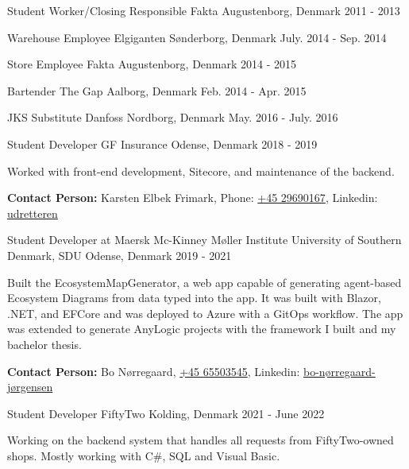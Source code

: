 \begin{cventries}
\cventry
{Student Worker/Closing Responsible} %
{Fakta} %
{Augustenborg, Denmark} %
{2011 - 2013} %
{}

\cventry
{Warehouse Employee} %
{Elgiganten} %
{Sønderborg, Denmark} %
{July. 2014 - Sep. 2014} %
{}

\cventry
{Store Employee} %
{Fakta} %
{Augustenborg, Denmark} %
{2014 - 2015} %
{}

\cventry
{Bartender} %
{The Gap} %
{Aalborg, Denmark} %
{Feb. 2014 -  Apr. 2015} %
{}

\cventry
{JKS Substitute} %
{Danfoss} %
{Nordborg, Denmark} %
{May. 2016 -  July. 2016} %
{}

\cventry
{Student Developer} %
{GF Insurance} %
{Odense, Denmark} %
{2018 -  2019} %
{
  \begin{cvitems}
    \item {Worked with front-end development, Sitecore, and maintenance of the backend.}
    \item {\textbf{Contact Person:} Karsten Elbek Frimark, Phone: \href{tel:29690167}{+45 29690167}, Linkedin: \href{https://dk.linkedin.com/in/udretteren/}{udretteren}}
  \end{cvitems}
}

\cventry
{Student Developer at Maersk Mc-Kinney Møller Institute} %
{University of Southern Denmark, SDU} %
{Odense, Denmark} %
{2019 - 2021} %
{
  \begin{cvitems}
    \item {Built the EcosystemMapGenerator, a web app capable of generating agent-based Ecosystem Diagrams from data typed into the app. It was built with Blazor, .NET, and EFCore and was deployed to Azure with a GitOps workflow. The app was extended to generate AnyLogic projects with the framework I built and my bachelor thesis.}
    \item {\textbf{Contact Person:} Bo Nørregaard, \href{tel:65503545}{+45 65503545}, Linkedin: \href{https://dk.linkedin.com/in/bo-nørregaard-jørgensen-1773201}{bo-nørregaard-jørgensen}}
  \end{cvitems}
}

\cventry
{Student Developer} %
{FiftyTwo} %
{Kolding, Denmark} %
{2021 - June 2022} %
{
  \begin{cvitems}
    \item {Working on the backend system that handles all requests from FiftyTwo-owned shops. Mostly working with C\#, SQL and Visual Basic.}
  \end{cvitems}
}


\end{cventries}
